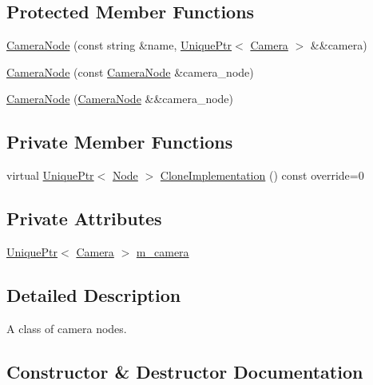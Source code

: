 \subsection*{Protected Member Functions}
\begin{DoxyCompactItemize}
\item 
\hyperlink{classmage_1_1_camera_node_a943cecfc5f96ad22f0f64d0f7b3f3640}{Camera\+Node} (const string \&name, \hyperlink{namespacemage_a8c307fbcc33bce9b7f2aa4c26c3b95cf}{Unique\+Ptr}$<$ \hyperlink{classmage_1_1_camera}{Camera} $>$ \&\&camera)
\item 
\hyperlink{classmage_1_1_camera_node_aa0becc29c416c313ebda763edb1b2181}{Camera\+Node} (const \hyperlink{classmage_1_1_camera_node}{Camera\+Node} \&camera\+\_\+node)
\item 
\hyperlink{classmage_1_1_camera_node_af46b911ecf12ed7c3cb31fb98a590fc1}{Camera\+Node} (\hyperlink{classmage_1_1_camera_node}{Camera\+Node} \&\&camera\+\_\+node)
\end{DoxyCompactItemize}
\subsection*{Private Member Functions}
\begin{DoxyCompactItemize}
\item 
virtual \hyperlink{namespacemage_a8c307fbcc33bce9b7f2aa4c26c3b95cf}{Unique\+Ptr}$<$ \hyperlink{classmage_1_1_node}{Node} $>$ \hyperlink{classmage_1_1_camera_node_a002d3a2b41cda270a26ca5d8f3a17f55}{Clone\+Implementation} () const override=0
\end{DoxyCompactItemize}
\subsection*{Private Attributes}
\begin{DoxyCompactItemize}
\item 
\hyperlink{namespacemage_a8c307fbcc33bce9b7f2aa4c26c3b95cf}{Unique\+Ptr}$<$ \hyperlink{classmage_1_1_camera}{Camera} $>$ \hyperlink{classmage_1_1_camera_node_a18f00f7ccd0c677043e11a1b3085dbfb}{m\+\_\+camera}
\end{DoxyCompactItemize}


\subsection{Detailed Description}
A class of camera nodes. 

\subsection{Constructor \& Destructor Documentation}
\hypertarget{classmage_1_1_camera_node_ac6612668e7b9f829e371794d422d357f}{}\label{classmage_1_1_camera_node_ac6612668e7b9f829e371794d422d357f} 
